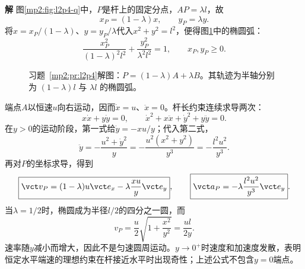 \documentclass[11pt,openany,fontset=fandol]{ctexbook}
\theoremstyle{definition}\newtheorem{example}{例}[chapter]\newtheorem{exercise}{习题}[chapter]
\newcommand{\SolutionStart}{\par\medskip\ifdim\pagetotal>0pt\ifdim\dimexpr\pagegoal-\pagetotal\relax<3\baselineskip\newpage\fi\fi\noindent\textbf{解}\quad\ignorespaces}
\newenvironment{solution}{\SolutionStart}{\par\medskip}
\begin{document}
\begin{solution}
图\ref{mp2:fig:l2p4-q}中，$P$是杆上的固定分点，$AP=\lambda l$，故
\[
 x_P=(1-\lambda)x,\qquad y_P=\lambda y.
\]
将$x=x_P/(1-\lambda)$、$y=y_P/\lambda$代入$x^2+y^2=l^2$，便得图\ref{mp2:fig:l2p4-s}中的椭圆弧：
\[
 \boxed{\frac{x_P^2}{(1-\lambda)^2l^2}
 +\frac{y_P^2}{\lambda^2l^2}=1},\qquad x_P,y_P\ge0.
\]
\begin{figure}[H]\centering
{}
\caption{习题~\ref{mp2:pr:l2p4}解图：$P=(1-\lambda)A+\lambda B$。其轨迹为半轴分别为 $(1-\lambda)l$ 与 $\lambda l$ 的椭圆弧。}\label{mp2:fig:l2p4-s}
\end{figure}
端点$A$以恒速$u$向右运动，因而$\dot x=u$、$\ddot x=0$。杆长约束连续求导两次：
\[
 x\dot x+y\dot y=0,\qquad
 \dot x^2+x\ddot x+\dot y^2+y\ddot y=0.
\]
在$y>0$的运动阶段，第一式给$\dot y=-xu/y$；代入第二式，
\[
 \ddot y=-\frac{u^2+\dot y^2}{y}
 =-\frac{u^2(x^2+y^2)}{y^3}
 =-\frac{l^2u^2}{y^3}.
\]
再对$P$的坐标求导，得到
\[
 \boxed{\vct v_P=(1-\lambda)u\vct e_x
 -\lambda\frac{xu}{y}\vct e_y},\qquad
 \boxed{\vct a_P=-\lambda\frac{l^2u^2}{y^3}\vct e_y}.
\]
当$\lambda=1/2$时，椭圆成为半径$l/2$的四分之一圆，而
\[
 v_P=\frac u2\sqrt{1+\frac{x^2}{y^2}}=\frac{ul}{2y}.
\]
速率随$y$减小而增大，因此不是匀速圆周运动。$y\to0^+$时速度和加速度发散，表明恒定水平端速的理想约束在杆接近水平时出现奇性；上述公式不包含$y=0$端点。
\end{solution}
\end{document}
